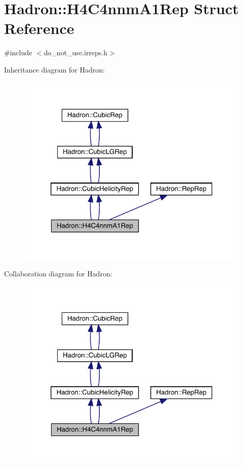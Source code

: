 \hypertarget{structHadron_1_1H4C4nnmA1Rep}{}\section{Hadron\+:\+:H4\+C4nnm\+A1\+Rep Struct Reference}
\label{structHadron_1_1H4C4nnmA1Rep}


{\ttfamily \#include $<$do\+\_\+not\+\_\+use.\+irreps.\+h$>$}



Inheritance diagram for Hadron\+:\nopagebreak
\begin{figure}[H]
\begin{center}
\leavevmode
\includegraphics[width=320pt]{d5/d80/structHadron_1_1H4C4nnmA1Rep__inherit__graph}
\end{center}
\end{figure}


Collaboration diagram for Hadron\+:\nopagebreak
\begin{figure}[H]
\begin{center}
\leavevmode
\includegraphics[width=320pt]{d9/dac/structHadron_1_1H4C4nnmA1Rep__coll__graph}
\end{center}
\end{figure}
